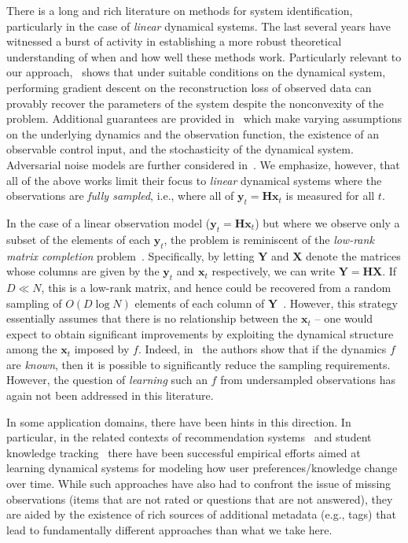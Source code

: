 \documentclass{article}
\newcommand{\vct}[1]{\boldsymbol{#1}}
\newcommand{\vx}{\vct{x}}
\newcommand{\vy}{\vct{y}}
\newcommand{\mtx}[1]{\boldsymbol{#1}}
\newcommand{\mH}{\mtx{H}}
\newcommand{\mX}{\mtx{X}}
\newcommand{\mY}{\mtx{Y}}
\begin{document}
There is a long and rich literature on methods for system identification, particularly in the case of \emph{linear} dynamical systems. The last several years have witnessed a burst of activity in establishing a more robust theoretical understanding of when and how well these methods work. Particularly relevant to our approach,~\cite{Hardt2018} shows that under suitable conditions on the dynamical system, performing gradient descent on the reconstruction loss of observed data can provably recover the parameters of the system despite the nonconvexity of the problem. Additional guarantees are provided in~\cite{Simchowitz2018,Hazan2018,Oymak2019,Tsiamis2019,Lee2020} which make varying assumptions on the underlying dynamics and the observation function, the existence of an observable control input, and the stochasticity of the dynamical system. Adversarial noise models are further considered in~\cite{Simchowitz2019,Simchowitz2020}. We emphasize, however, that all of the above works limit their focus to \emph{linear} dynamical systems where the observations are \emph{fully sampled}, i.e., where all of $\vy_t = \mH \vx_t$ is measured for all $t$. 

In the case of a linear observation model ($\vy_t = \mH \vx_t$) but where we observe only a subset of the elements of each $\vy_t$, the problem is reminiscent of the \emph{low-rank matrix completion} problem~\cite{Davenport2016}. Specifically, by letting $\mY$ and $\mX$ denote the matrices whose columns are given by the $\vy_t$ and $\vx_t$ respectively, we can write $\mY = \mH \mX$.  If $D \ll N$, this is a low-rank matrix, and hence could be recovered from a random sampling of $O(D \log N)$ elements of each column of $\mY$~\cite{Davenport2016}. However, this strategy essentially assumes that there is no relationship between the $\vx_t$ -- one would expect to obtain significant improvements by exploiting the dynamical structure among the $\vx_t$ imposed by $f$. Indeed, in~\cite{Xu2016,Xu2017} the authors show that if the dynamics $f$ are \emph{known}, then it is possible to significantly reduce the sampling requirements. However, the question of \emph{learning} such an $f$ from undersampled observations has again not been addressed in this literature.

In some application domains, there have been hints in this direction. In particular, in the related contexts of recommendation systems~\cite{Hidasi2015,Wu2017} and student knowledge tracking~\cite{Piech2015,Xu2020} there have been successful empirical efforts aimed at learning dynamical systems for modeling how user preferences/knowledge change over time. While such approaches have also had to confront the issue of missing observations (items that are not rated or questions that are not answered), they are aided by the existence of rich sources of additional metadata (e.g., tags) that lead to fundamentally different approaches than what we take here.
\end{document}
